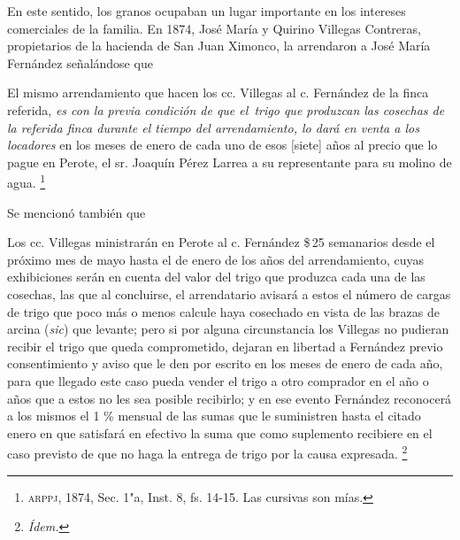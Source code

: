 \documentclass[14pt,twoside,final]{extbook} %
\let\oldfootnote\footnote
\renewcommand\footnote[1]{%
\oldfootnote{\hspace{1mm}#1}}
\begin{document}
En este sentido, los granos ocupaban un lugar importante en los intereses comerciales de la familia. En 1874, José María y Quirino Villegas Contreras, propietarios de la hacienda de San Juan Ximonco, la arrendaron a José María Fernández señalándose que
\begin{quoting}
El mismo arrendamiento que hacen los cc. Villegas al c. Fernández de la finca referida, \emph{es con la previa condición de que el~trigo que produzcan las cosechas de la referida finca durante el tiempo del arrendamiento, lo dará en venta a los locadores} en los meses de enero de cada uno de esos [siete] años al precio que lo pague en Perote, el sr. Joaquín Pérez Larrea a su representante para su molino de agua.\footnote{\textsc{arppj}, 1874, Sec. 1"a, Inst. 8, fs. 14-15. Las cursivas son mías.} 
\end{quoting}
Se mencionó también que
\begin{quoting}
Los cc. Villegas ministrarán en Perote al c. Fernández \$\,25 semanarios desde el próximo mes de mayo hasta el de enero de los años del arrendamiento, cuyas exhibiciones serán en cuenta del valor del trigo que produzca cada una de las cosechas, las que al concluirse, el arrendatario avisará a estos el número de cargas de trigo que poco más o menos calcule haya cosechado en vista de las brazas de arcina (\emph{sic}) que levante; pero si por alguna circunstancia los Villegas no pudieran recibir el trigo que queda comprometido, dejaran en libertad a Fernández previo consentimiento y aviso que le den por escrito en los meses de enero de cada año, para que llegado este caso pueda vender el trigo a otro comprador en el año o años que a estos no les sea posible recibirlo; y en ese evento Fernández reconocerá a los mismos el 1 \% mensual de las sumas que le suministren hasta el citado enero en que satisfará en efectivo la suma que como suplemento recibiere en el caso previsto de que no haga la entrega de trigo por la causa expresada.\footnote{\em Ídem.}
\end{quoting}
\end{document}
